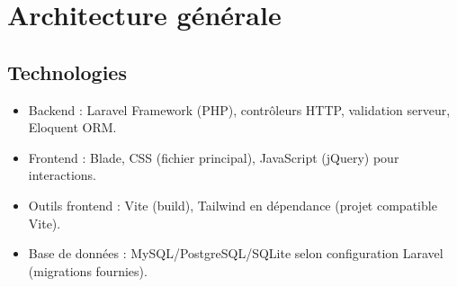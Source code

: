 \documentclass[12pt,a4paper]{article}
\begin{document}
\section{Architecture générale}

\subsection{Technologies}
\begin{itemize}[leftmargin=*]
  \item Backend : Laravel Framework (PHP), contrôleurs HTTP, validation serveur, Eloquent ORM.
  \item Frontend : Blade, CSS (fichier principal), JavaScript (jQuery) pour interactions.
  \item Outils frontend : Vite (build), Tailwind en dépendance (projet compatible Vite).
  \item Base de données : MySQL/PostgreSQL/SQLite selon configuration Laravel (migrations fournies).
\end{itemize}
\end{document}
